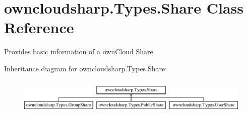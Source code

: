 \hypertarget{classowncloudsharp_1_1_types_1_1_share}{}\section{owncloudsharp.\+Types.\+Share Class Reference}
\label{classowncloudsharp_1_1_types_1_1_share}


Provides basic information of a own\+Cloud \hyperlink{classowncloudsharp_1_1_types_1_1_share}{Share}  


Inheritance diagram for owncloudsharp.\+Types.\+Share\+:\begin{figure}[H]
\begin{center}
\leavevmode
\includegraphics[height=1.720430cm]{classowncloudsharp_1_1_types_1_1_share}
\end{center}
\end{figure}
